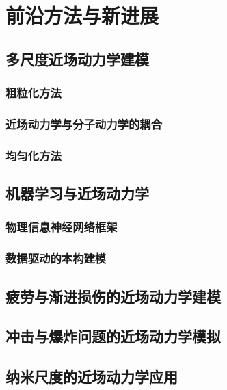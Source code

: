 \chapter{前沿方法与新进展}

\section{多尺度近场动力学建模}
\subsection{粗粒化方法}
\subsection{近场动力学与分子动力学的耦合}
\subsection{均匀化方法}

\section{机器学习与近场动力学}
\subsection{物理信息神经网络框架}
\subsection{数据驱动的本构建模}

\section{疲劳与渐进损伤的近场动力学建模}

\section{冲击与爆炸问题的近场动力学模拟}

\section{纳米尺度的近场动力学应用}
